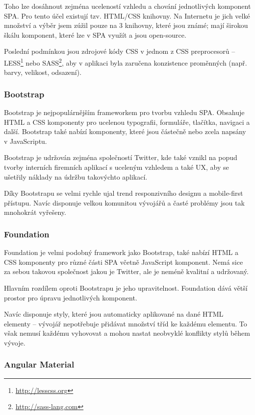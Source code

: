 Toho lze dosáhnout zejména uceleností vzhledu a chování jednotlivých komponent SPA. Pro tento účel existují tzv. HTML/CSS knihovny. Na Internetu je jich velké množství a výběr jsem zúžil pouze na 3 knihovny, které jsou známé; mají širokou škálu komponent, které lze v SPA využít a jsou open-source.

Poslední podmínkou jsou zdrojové kódy CSS v jednom z CSS preprocesorů\cite{css:preproc} -- LESS\footnote{\url{http://lesscss.org}} nebo SASS\footnote{\url{http://sass-lang.com}}, aby v aplikaci byla zaručena konzistence proměnných (např. barvy, velikost, odsazení).

\subsubsection*{Bootstrap}

Bootstrap je nejpopulárnějším frameworkem pro tvorbu vzhledu SPA. Obsahuje HTML a CSS komponenty pro ucelenou typografii, formuláře, tlačítka, navigaci a další. Bootstrap také nabízí komponenty, které jsou částečně nebo zcela napsány v JavaScriptu.

Bootstrap je udržován zejména společností Twitter, kde také vznikl na popud tvorby interních firemních aplikací s uceleným vzhledem a také UX, aby se ušetřily náklady na údržbu takovýchto aplikací.

Díky Bootstrapu se velmi rychle ujal trend responzivního designu a mobile-first přístupu. Navíc disponuje velkou komunitou vývojářů a časté problémy jsou tak mnohokrát vyřešeny.

\subsubsection*{Foundation}

Foundation je velmi podobný framework jako Bootstrap, také nabízí HTML a CSS komponenty pro různé části SPA včetně JavaScript komponent. Nemá sice za sebou takovou společnost jakou je Twitter, ale je neméně kvalitní a udržovaný.

Hlavním rozdílem oproti Bootstrapu je jeho upravitelnost. Foundation dává větší prostor pro úpravu jednotlivých komponent. 

Navíc disponuje styly, které jsou automaticky aplikované na dané HTML elementy -- vývojář nepotřebuje přidávat množství tříd ke každému elementu. To však nemusí každému vyhovovat a mohou nastat neobvyklé konflikty stylů během vývoje.

\subsubsection*{Angular Material}

